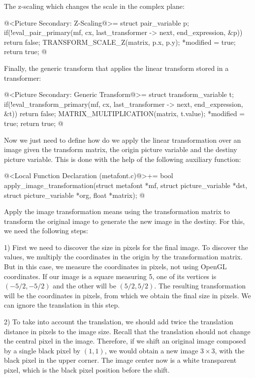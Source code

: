 {{{{{The z-scaling which changes the scale in the complex plane:

\iniciocodigo
@<Picture Secondary: Z-Scaling@>=
struct pair_variable p;
if(!eval_pair_primary(mf, cx, last_transformer -> next, end_expression, &p))
  return false;
TRANSFORM_SCALE_Z(matrix, p.x, p.y);
*modified = true;
return true;
@
\fimcodigo

Finally, the generic transform that applies the linear transform
stored in a transformer:

\iniciocodigo
@<Picture Secondary: Generic Transform@>=
struct transform_variable t;
if(!eval_transform_primary(mf, cx, last_transformer -> next, end_expression,
                           &t))
  return false;
MATRIX_MULTIPLICATION(matrix, t.value);
*modified = true;
return true;
@
\fimcodigo

Now we just need to define how do we apply the linear transformation
over an image given the transform matrix, the origin picture variable
and the destiny picture variable. This is done with the help of the
following auxiliary function:

\iniciocodigo
@<Local Function Declaration (metafont.c)@>+=
bool apply_image_transformation(struct metafont *mf,
                                struct picture_variable *dst,
                                struct picture_variable *org,
                                float *matrix);
@
\fimcodigo

Apply the image transformation means using the transformation matrix
to transform the original image to generate the new image in the
destiny. For this, we need the following steps:

1) First we need to discover the size in pixels for the final
image. To discover the values, we multiply the coordinates in the
origin by the transformation matrix. But in this case, we measure the
coordinates in pixels, not using OpenGL coordinates. If our image is a
square measuring 5, one of its vertices is $(-5/2, -5/2)$ and the
other will be $(5/2, 5/2)$. The resulting transformation will be the
coordinates in pixels, from which we obtain the final size in
pixels. We can ignore the translation in this step.

2) To take into account the translation, we should add twice the
translation distance in pixels to the image size. Recall that the
translation should not change the central pixel in the
image. Therefore, if we shift an original image composed by a single
black pixel by $(1, 1)$, we would obtain a new image $3 \times 3$,
with the black pixel in the upper corner. The image center now is a
white transparent pixel, which is the black pixel position before the
shift.

}}}}}
